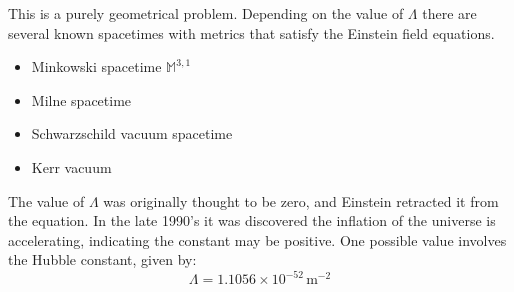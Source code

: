 \documentclass{beamer}
\begin{document}
    \begin{frame}
        This is a purely geometrical problem. Depending on the value of
        $\Lambda$ there are several known spacetimes with metrics that satisfy
        the Einstein field equations.
        \begin{itemize}
            \item Minkowski spacetime $\mathbb{M}^{3,1}$
            \item Milne spacetime
            \item Schwarzschild vacuum spacetime
            \item Kerr vacuum
        \end{itemize}
        The value of $\Lambda$ was originally thought to be zero, and Einstein
        retracted it from the equation. In the late 1990's it was discovered
        the inflation of the universe is accelerating, indicating the constant
        may be positive. One possible value involves the Hubble constant, given
        by:
        \begin{equation}
            \Lambda=1.1056\times{10}^{-52}\,\textrm{m}^{-2}
        \end{equation}
    \end{frame}
\end{document}
